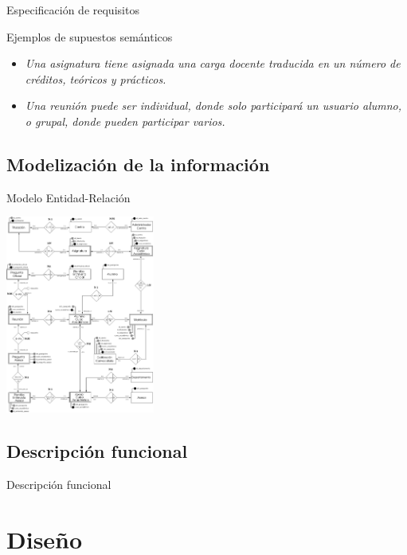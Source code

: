 \documentclass[10pt, hyperref={pdfpagelabels=false}]{beamer}
\begin{document}
      \begin{frame}{Especificación de requisitos}
        \begin{block}{Ejemplos de supuestos semánticos}
          \begin{itemize}
            \item \textit{Una asignatura tiene asignada una carga docente
                  traducida en un número de créditos, teóricos y prácticos.}
            \item \textit{Una reunión puede ser individual, donde solo
                  participará un usuario alumno, o grupal, donde pueden
                  participar varios.}
          \end{itemize}
        \end{block}
      \end{frame}


    \subsection{Modelización de la información}
      \begin{frame}{Modelo Entidad-Relación}
        \begin{center}
          \includegraphics[height=6.5cm]{Diagramas/diagramaER}
        \end{center}
      \end{frame}

    \subsection{Descripción funcional}
      \begin{frame}{Descripción funcional}

      \end{frame}


  \section{Diseño}
\end{document}

